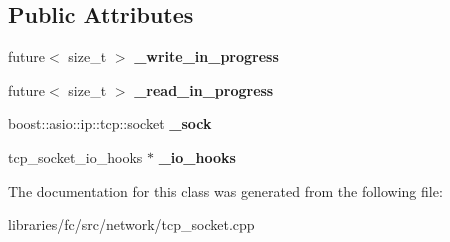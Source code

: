 \subsection*{Public Attributes}
\begin{DoxyCompactItemize}
\item 
\mbox{\label{classfc_1_1tcp__socket_1_1impl_a6a27944b846b60683fc76c0722ab0b3d}} 
future$<$ size\+\_\+t $>$ {\bfseries \+\_\+write\+\_\+in\+\_\+progress}
\item 
\mbox{\label{classfc_1_1tcp__socket_1_1impl_a8cba3c5b6af202d8d2c41ab98ff11747}} 
future$<$ size\+\_\+t $>$ {\bfseries \+\_\+read\+\_\+in\+\_\+progress}
\item 
\mbox{\label{classfc_1_1tcp__socket_1_1impl_ac4695f911178daec324a35c6ff0ac265}} 
boost\+::asio\+::ip\+::tcp\+::socket {\bfseries \+\_\+sock}
\item 
\mbox{\label{classfc_1_1tcp__socket_1_1impl_af5804ebfc87107a3e4a596d307a35158}} 
tcp\+\_\+socket\+\_\+io\+\_\+hooks $\ast$ {\bfseries \+\_\+io\+\_\+hooks}
\end{DoxyCompactItemize}


The documentation for this class was generated from the following file\+:\begin{DoxyCompactItemize}
\item 
libraries/fc/src/network/tcp\+\_\+socket.\+cpp\end{DoxyCompactItemize}
